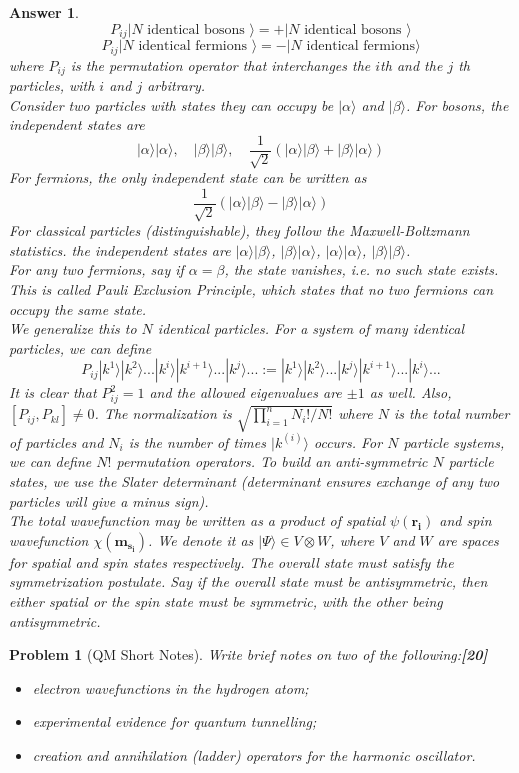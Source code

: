 \documentclass[a4paper]{article}
\newtheorem{ans}{Answer}[subsection]
\theoremstyle{new}
\newtheorem{qns}{Problem}[subsection]
\begin{document}
\begin{ans}
$$P_{ij}|N\text{ identical bosons }\rangle=+|N\text{ identical bosons }\rangle$$
$$P_{ij}|N\text{ identical fermions }\rangle=-|N\text{ identical fermions}\rangle$$
where $P_{ij}$ is the permutation operator that interchanges the $i$th and the $j$ th particles, with $i$ and $j$ arbitrary.\\[5pt]
Consider two particles with states they can occupy be $|\alpha\rangle$ and $|\beta\rangle$. For bosons, the independent states are
$$|\alpha\rangle|\alpha\rangle,\quad|\beta\rangle|\beta\rangle,\quad\frac{1}{\sqrt{2}}(|\alpha\rangle|\beta\rangle+|\beta\rangle|\alpha\rangle)$$
For fermions, the only independent state can be written as
$$\frac{1}{\sqrt{2}}(|\alpha\rangle|\beta\rangle-|\beta\rangle|\alpha\rangle)$$
For classical particles (distinguishable), they follow the Maxwell-Boltzmann statistics. the independent states are $|\alpha\rangle|\beta\rangle$, $|\beta\rangle|\alpha\rangle$, $|\alpha\rangle|\alpha\rangle$, $|\beta\rangle|\beta\rangle$.\\[5pt]
For any two fermions, say if $\alpha=\beta$, the state vanishes, i.e. no such state exists. This is called Pauli Exclusion Principle, which states that no two fermions can occupy the same state.\\[5pt]
We generalize this to $N$ identical particles. For a system of many identical particles, we can define
$$P_{ij}|k^1\rangle|k^2\rangle...|k^i\rangle|k^{i+1}\rangle...|k^j\rangle...:=|k^1\rangle|k^2\rangle...|k^j\rangle|k^{i+1}\rangle...|k^i\rangle...$$
It is clear that $P_{ij}^2=1$ and the allowed eigenvalues are $\pm 1$ as well. Also, $[P_{ij},P_{kl}]\neq 0$. The normalization is $\sqrt{\prod_{i=1}^nN_i!/N!}$ where $N$ is the total number of particles and $N_i$ is the number of times $|k^{(i)}\rangle$ occurs. For $N$ particle systems, we can define $N!$ permutation operators. To build an anti-symmetric $N$ particle states, we use the Slater determinant (determinant ensures exchange of any two particles will give a minus sign).\\[5pt]
The total wavefunction may be written as a product of spatial $\psi(\mathbf{r_i})$ and spin wavefunction $\chi(\mathbf{m_{s_i}})$. We denote it as $|\Psi\rangle\in V\otimes W$, where $V$ and $W$ are spaces for spatial and spin states respectively. The overall state must satisfy the symmetrization postulate. Say if the overall state must be antisymmetric, then either spatial or the spin state must be symmetric, with the other being antisymmetric.
\end{ans}
\newpage
\begin{qns}[QM Short Notes]
Write brief notes on two of the following:\hfill\textbf{[20]}
\begin{itemize}
    \item electron wavefunctions in the hydrogen atom;
    \item experimental evidence for quantum tunnelling;
    \item creation and annihilation (ladder) operators for the harmonic oscillator.
\end{itemize}
\end{qns}
\end{document}
